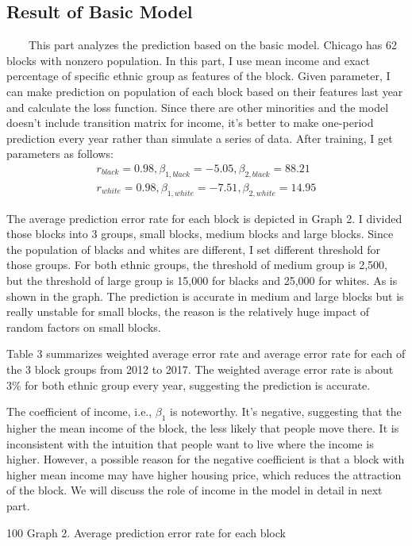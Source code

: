 \documentclass{article}
\begin{document}
\subsection{Result of Basic Model}
\ \ \ \ This part analyzes the prediction based on the basic model. Chicago has 62 blocks with nonzero population. In this part, I use mean income and exact percentage of specific ethnic group as features of the block. Given parameter, I can make prediction on population of each block based on their features last year and calculate the loss function. Since there are other minorities and the model doesn't include transition matrix for income, it's better to make one-period prediction every year rather than simulate a series of data. After training, I get parameters as follows:
\begin{eqnarray}
r_{black} = 0.98, \beta_{1,black} = -5.05, \beta_{2,black} = 88.21 \nonumber \\
r_{white} = 0.98, \beta_{1,white} = -7.51, \beta_{2,white} = 14.95 \nonumber
\end{eqnarray}
\par The average prediction error rate for each block is depicted in Graph 2. I divided those blocks into 3 groups, small blocks, medium blocks and large blocks. Since the population of blacks and whites are different, I set different threshold for those groups. For both ethnic groups, the threshold of medium group is 2,500, but the threshold of large group is 15,000 for blacks and 25,000 for whites. As is shown in the graph. The prediction is accurate in medium and large blocks but is really unstable for small blocks, the reason is the relatively huge impact of random factors on small blocks. 
\par Table 3 summarizes weighted average error rate and average error rate for each of the 3 block groups from 2012 to 2017. The weighted average error rate is about 3\% for both ethnic group every year, suggesting the prediction is accurate.
\par The coefficient of income, i.e., $\beta_1$ is noteworthy. It's negative, suggesting that the higher the mean income of the block, the less likely that people move there. It is inconsistent with the intuition that people want to live where the income is higher. However, a possible reason for the negative coefficient is that a block with higher mean income may have higher housing price, which reduces the attraction of the block. We will discuss the role of income in the model in detail in next part.
\clearpage
\centerline{{\color{white} 100} Graph 2. Average prediction error rate for each block}
\end{document}
